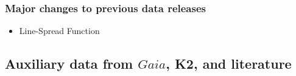 \documentclass[
  journal=pasa,
  manuscript=research-paper, %
  year=2021,
  volume=37
]{cup-journal}
\begin{document}
\subsubsection{Major changes to previous data releases} \label{sec:major_changes_to_previous_data_releases}

\begin{itemize}
    \item Line-Spread Function
\end{itemize}






\subsection{Auxiliary data from $Gaia$, K2, and literature} \label{sec:non-spec_data}
\end{document}
